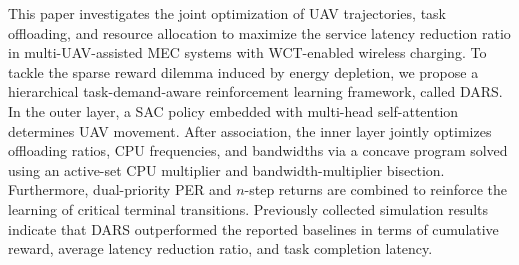 \documentclass[journal]{IEEEtran}
\begin{document}
This paper investigates the joint optimization of UAV trajectories, task offloading, and resource allocation to maximize the service latency reduction ratio in multi-UAV-assisted MEC systems with WCT-enabled wireless charging. To tackle the sparse reward dilemma induced by energy depletion, we propose a hierarchical task-demand-aware reinforcement learning framework, called DARS. In the outer layer, a SAC policy embedded with multi-head self-attention determines UAV movement. After association, the inner layer jointly optimizes offloading ratios, CPU frequencies, and bandwidths via a concave program solved using an active-set CPU multiplier and bandwidth-multiplier bisection. Furthermore, dual-priority PER and $n$-step returns are combined to reinforce the learning of critical terminal transitions. Previously collected simulation results indicate that DARS outperformed the reported baselines in
terms of cumulative reward, average latency reduction ratio, and task
completion latency.







%




\end{document}

